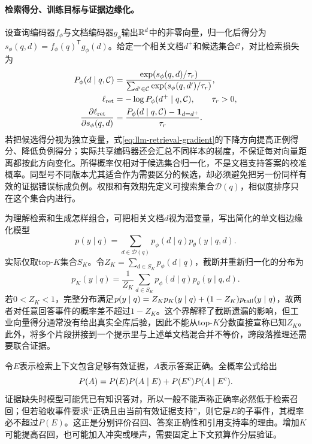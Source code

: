 \paragraph{检索得分、训练目标与证据边缘化。}
设查询编码器$f_\phi$与文档编码器$g_\phi$输出$\mathbb{R}^d$中的非零向量，归一化后得分为$s_\phi(q,d)=f_\phi(q)^{\mathsf T}g_\phi(d)$。给定一个相关文档$d^+$和候选集合$\mathcal C$，对比检索损失为
\begin{align}
 P_\phi(d\mid q,\mathcal C)&=\frac{\exp(s_\phi(q,d)/\tau_r)}{\sum_{d'\in\mathcal C}\exp(s_\phi(q,d')/\tau_r)},\\
 \ell_{\rm ret}&=-\log P_\phi(d^+\mid q,\mathcal C),\qquad \tau_r>0,\\
 \frac{\partial\ell_{\rm ret}}{\partial s_\phi(q,d)}&=\frac{P_\phi(d\mid q,\mathcal C)-\mathbf1_{d=d^+}}{\tau_r}.\label{eq:llm-retrieval-gradient}
\end{align}
若把候选得分视为独立变量，式\eqref{eq:llm-retrieval-gradient}的下降方向提高正例得分、降低负例得分；实际共享编码器还会汇总不同样本的梯度，不保证每对向量距离都按此方向变化。所得概率仅相对于候选集合归一化，不是文档支持答案的校准概率。同型号不同版本尤其适合作为需要区分的候选，却必须避免把另一份同样有效的证据错误标成负例。权限和有效期先定义可搜索集合$\mathcal D(q)$，相似度排序只在这个集合内进行。

为理解检索和生成怎样组合，可把相关文档$d$视为潜变量，写出简化的单文档边缘化模型
\begin{equation}
 p(y\mid q)=\sum_{d\in\mathcal D(q)}p_\phi(d\mid q)p_\theta(y\mid q,d).
\end{equation}
实际仅取top-$K$集合$S_K$。令$Z_K=\sum_{d\in S_K}p_\phi(d\mid q)$，截断并重新归一化的分布为
\begin{equation}
 p_K(y\mid q)=\frac1{Z_K}\sum_{d\in S_K}p_\phi(d\mid q)p_\theta(y\mid q,d).
\end{equation}
若$0<Z_K<1$，完整分布满足$p(y\mid q)=Z_Kp_K(y\mid q)+(1-Z_K)p_{\rm tail}(y\mid q)$，故两者对任意回答事件的概率差不超过$1-Z_K$。这个界解释了截断遗漏的影响，但工业向量得分通常没有给出真实全库后验，因此不能从top-$K$分数直接宣称已知$Z_K$。此外，将多个片段拼接到一个提示里与上述单文档混合并不等价，跨段落推理还需要联合证据。

令$E$表示检索上下文包含足够有效证据，$A$表示答案正确。全概率公式给出
\begin{equation}
 P(A)=P(E)P(A\mid E)+P(E^{\rm c})P(A\mid E^{\rm c}).
\end{equation}
证据缺失时模型可能凭已有知识答对，所以一般不能声称正确率必然低于检索召回；但若验收事件要求“正确且由当前有效证据支持”，则它是$E$的子事件，其概率必不超过$P(E)$。这正是分别评价召回、答案正确性和引用支持率的理由。增加$K$可能提高召回，也可能加入冲突或噪声，需要固定上下文预算作分层验证。

